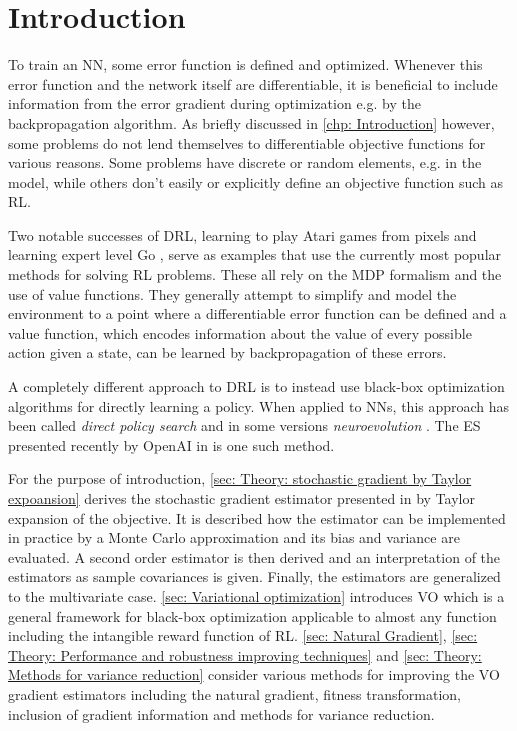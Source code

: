 
\section{Introduction}
To train an \gls{NN}, some error function is defined and optimized. 
Whenever this error function and the network itself are differentiable, it is beneficial to include information from the error gradient during optimization e.g. by the backpropagation algorithm. As briefly discussed in \autoref{chp: Introduction} however, some problems do not lend themselves to differentiable objective functions for various reasons.
Some problems have discrete or random elements, e.g. in the model, while others don't easily or explicitly define an objective function such as \gls{RL}. 

Two notable successes of \gls{DRL}, learning to play Atari games from pixels \cite{Mnih2015} and learning expert level Go \cite{Silver2016}, serve as examples that use the currently most popular methods for solving \gls{RL} problems. These all rely on the \gls{MDP} formalism and the use of value functions. They generally attempt to simplify and model the environment to a point where a differentiable error function can be defined and a value function, which encodes information about the value of every possible action given a state, can be learned by backpropagation of these errors.

A completely different approach to \gls{DRL} is to instead use black-box optimization algorithms for directly learning a policy. When applied to \glspl{NN}, this approach has been called \textit{direct policy search} \cite{Schmidhuber1999} and in some versions \textit{neuroevolution} \cite{Risi2015}. The \gls{ES} presented recently by OpenAI in \cite{Salimans2017} is one such method.

For the purpose of introduction, \autoref{sec: Theory: stochastic gradient by Taylor expoansion} derives the stochastic gradient estimator presented in \cite{Salimans2017} by Taylor expansion of the objective. It is described how the estimator can be implemented in practice by a Monte Carlo approximation and its bias and variance are evaluated. A second order estimator is then derived and an interpretation of the estimators as sample covariances is given. Finally, the estimators are generalized to the multivariate case.
\autoref{sec: Variational optimization} introduces \gls{VO} which is a general framework for black-box optimization applicable to almost any function including the intangible reward function of \gls{RL}. \autoref{sec: Natural Gradient}, \ref{sec: Theory: Performance and robustness improving techniques} and \ref{sec: Theory: Methods for variance reduction} consider various methods for improving the \gls{VO} gradient estimators including the natural gradient, fitness transformation, inclusion of gradient information and methods for variance reduction.


